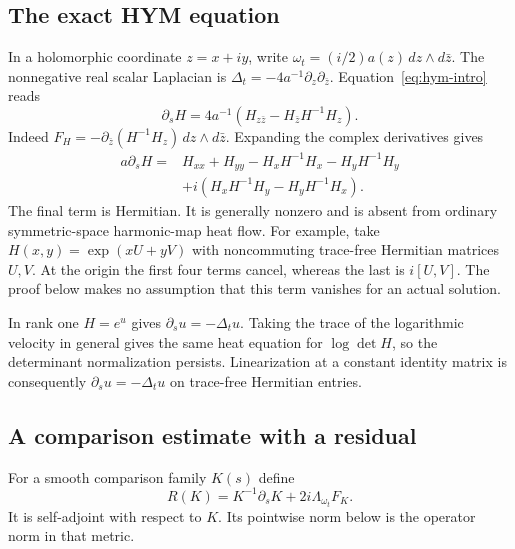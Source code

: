 \subsection{The exact HYM equation}
In a holomorphic coordinate $z=x+iy$, write
$\omega_t=(i/2)a(z)\,dz\wedge d\bar z$. The nonnegative real
scalar Laplacian is $\Delta_t=-4a^{-1}\partial_z\partial_{\bar z}$.
Equation~\eqref{eq:hym-intro} reads
\begin{equation}\label{eq:complex-hym}
 \partial_sH=4a^{-1}(H_{z\bar z}-H_{\bar z}H^{-1}H_z).
\end{equation}
Indeed $F_H=-\partial_{\bar z}(H^{-1}H_z)\,dz\wedge d\bar z$.
Expanding the complex derivatives gives
\begin{equation}\label{eq:real-hym}
 \begin{split}
 a\partial_sH={}&H_{xx}+H_{yy}-H_xH^{-1}H_x-H_yH^{-1}H_y\\
 &+i(H_xH^{-1}H_y-H_yH^{-1}H_x).
 \end{split}
\end{equation}
The final term is Hermitian. It is generally nonzero and is absent
from ordinary symmetric-space harmonic-map heat flow. For example,
take $H(x,y)=\exp(xU+yV)$ with noncommuting trace-free Hermitian
matrices $U,V$. At the origin the first four terms cancel, whereas
the last is $i[U,V]$. The proof below makes no assumption that this
term vanishes for an actual solution.

In rank one $H=e^u$ gives $\partial_su=-\Delta_tu$. Taking the
trace of the logarithmic velocity in general gives the same heat
equation for $\log\det H$, so the determinant normalization persists.
Linearization at a constant identity matrix is consequently
$\partial_su=-\Delta_tu$ on trace-free Hermitian entries.

\subsection{A comparison estimate with a residual}
For a smooth comparison family $K(s)$ define
\begin{equation}\label{eq:residual}
 R(K)=K^{-1}\partial_sK+2i\Lambda_{\omega_t}F_K.
\end{equation}
It is self-adjoint with respect to $K$. Its pointwise norm below is
the operator norm in that metric.

